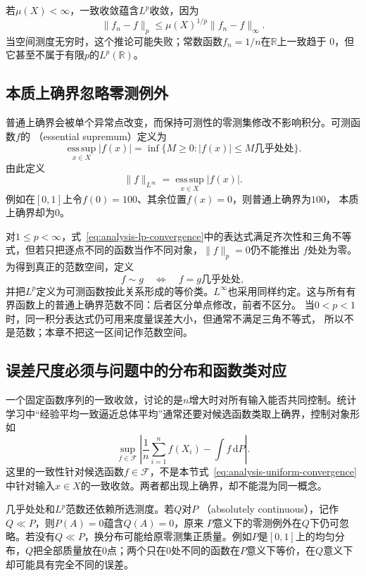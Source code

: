 若$\mu(X)<\infty$，一致收敛蕴含$L^p$收敛，因为
\[   \lVert f_n-f\rVert_p   \leq   \mu(X)^{1/p}\lVert f_n-f\rVert_{\infty}. \]
当空间测度无穷时，这个推论可能失败；常数函数$f_n=1/n$在$\mathbb{R}$上一致趋于 $0$，但它甚至不属于有限$p$的$L^p(\mathbb{R})$。
\subsection{本质上确界忽略零测例外}

普通上确界会被单个异常点改变，而保持可测性的零测集修改不影响积分。可测函数$f$的
（essential supremum）定义为
\[   \operatorname*{ess\,sup}_{x\in X}|f(x)|   =   \inf\{M\geq0:|f(x)|\leq M\text{几乎处处}\}. \]
由此定义
\begin{equation}
  \lVert f\rVert_{L^\infty}
  =
  \operatorname*{ess\,sup}_{x\in X}|f(x)|.
\label{eq:analysis-essential-supremum-norm}
\end{equation}
例如在$[0,1]$上令$f(0)=100$、其余位置$f(x)=0$，则普通上确界为$100$， 本质上确界却为$0$。

对$1\leq p<\infty$，式~\eqref{eq:analysis-lp-convergence}中的表达式满足齐次性和三角不等式，但若只把逐点不同的函数当作不同对象，$\lVert f\rVert_p=0$仍不能推出 $f$处处为零。为得到真正的范数空间，定义
\[   f\sim g   \quad\Longleftrightarrow\quad   f=g\text{几乎处处}, \]
并把$L^p$定义为可测函数按此关系形成的等价类。$L^\infty$也采用同样约定。这与所有有界函数上的普通上确界范数不同：后者区分单点修改，前者不区分。
当$0<p<1$时，同一积分表达式仍可用来度量误差大小，但通常不满足三角不等式，
所以不是范数；本章不把这一区间记作范数空间。
\subsection{误差尺度必须与问题中的分布和函数类对应}

一个固定函数序列的一致收敛，讨论的是$n$增大时对所有输入能否共同控制。统计学习中“经验平均一致逼近总体平均”通常还要对候选函数类取上确界，控制对象形如
\[   \sup_{f\in\mathcal{F}}   \left|     \frac1n\sum_{i=1}^nf(X_i)-\int f\,\mathrm{d}P   \right|. \]
这里的一致性针对候选函数$f\in\mathcal{F}$，不是本节式~\eqref{eq:analysis-uniform-convergence}中针对输入$x\in X$的一致收敛。两者都出现上确界，却不能混为同一概念。

几乎处处和$L^p$范数还依赖所选测度。若$Q$对$P$
（absolutely continuous），记作$Q\ll P$，则$P(A)=0$蕴含$Q(A)=0$，原来 $P$意义下的零测例外在$Q$下仍可忽略。若没有$Q\ll P$，换分布可能给原零测集正质量。例如$P$是$[0,1]$上的均匀分布，$Q$把全部质量放在$0$点；两个只在$0$处不同的函数在$P$意义下等价，在$Q$意义下却可能具有完全不同的误差。
